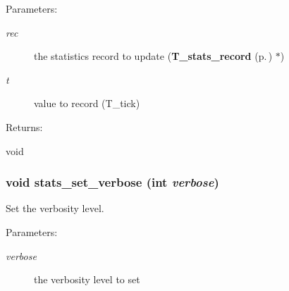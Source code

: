 \begin{Desc}
\item[Parameters: ]\par
\begin{description}
\item[{\em 
rec}]the statistics record to update ({\bf T\_\-stats\_\-record} {\rm (p.\,\pageref{structT__stats__record})} $\ast$) \item[{\em 
t}]value to record (T\_\-tick) \end{description}
\end{Desc}
\begin{Desc}
\item[Returns: ]\par
void \end{Desc}
\subsubsection{\setlength{\rightskip}{0pt plus 5cm}void stats\_\-set\_\-verbose (int {\em verbose})}\label{bucket__stats_8h_a13}


Set the verbosity level.

\begin{Desc}
\item[Parameters: ]\par
\begin{description}
\item[{\em 
verbose}]the verbosity level to set \end{description}
\end{Desc}
